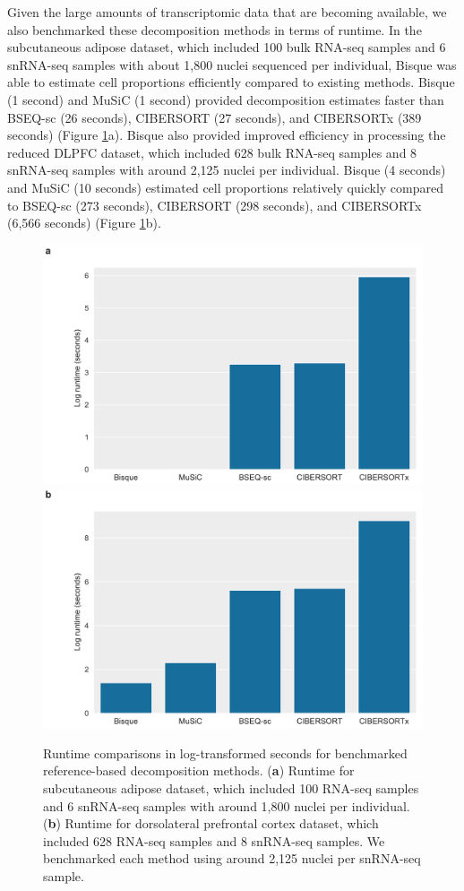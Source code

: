 Given the large amounts of transcriptomic data that are becoming available, we also benchmarked these decomposition methods in terms of runtime. In the subcutaneous adipose dataset, which included 100 bulk RNA-seq samples and 6 snRNA-seq samples with about 1,800 nuclei sequenced per individual, Bisque was able to estimate cell proportions efficiently compared to existing methods. Bisque (1 second) and MuSiC (1 second) provided decomposition estimates faster than BSEQ-sc (26 seconds), CIBERSORT (27 seconds), and CIBERSORTx (389 seconds) (Figure \ref{fig:fig2.5}a).  Bisque also provided improved efficiency in processing the reduced DLPFC dataset, which included 628 bulk RNA-seq samples and 8 snRNA-seq samples with around 2,125 nuclei per individual. Bisque (4 seconds) and MuSiC (10 seconds) estimated cell proportions relatively quickly compared to BSEQ-sc (273 seconds), CIBERSORT (298 seconds), and CIBERSORTx (6,566 seconds) (Figure \ref{fig:fig2.5}b).

\begin{figure}
\centering
\includegraphics[scale=.19]{chapter2/figures/fig5a.pdf}
\includegraphics[scale=.19]{chapter2/figures/fig5b.pdf}
\caption{
    Runtime comparisons in log-transformed seconds for benchmarked reference-based decomposition methods.
    (\textbf{a}) Runtime for subcutaneous adipose dataset, which included 100 RNA-seq samples and 6 snRNA-seq samples with around 1,800 nuclei per individual.
    (\textbf{b}) Runtime for dorsolateral prefrontal cortex dataset, which included 628 RNA-seq samples and 8 snRNA-seq samples. We benchmarked each method using around 2,125 nuclei per snRNA-seq sample.
    }
\label{fig:fig2.5}
\end{figure}


